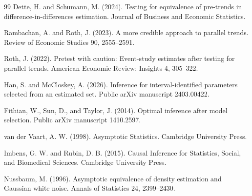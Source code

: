 \documentclass{article}
\begin{document}
\begin{thebibliography}{99}
   Dette, H. and Schumann, M. (2024). Testing for equivalence of pre-trends in difference-in-differences estimation. Journal of Business and Economic Statistics.

   Rambachan, A. and Roth, J. (2023). A more credible approach to parallel trends. Review of Economic Studies 90, 2555--2591.

   Roth, J. (2022). Pretest with caution: Event-study estimates after testing for parallel trends. American Economic Review: Insights 4, 305--322.

   Han, S. and McCloskey, A. (2026). Inference for interval-identified parameters selected from an estimated set. Public arXiv manuscript 2403.00422.

   Fithian, W., Sun, D., and Taylor, J. (2014). Optimal inference after model selection. Public arXiv manuscript 1410.2597.

   van der Vaart, A. W. (1998). Asymptotic Statistics. Cambridge University Press.

   Imbens, G. W. and Rubin, D. B. (2015). Causal Inference for Statistics, Social, and Biomedical Sciences. Cambridge University Press.

   Nussbaum, M. (1996). Asymptotic equivalence of density estimation and Gaussian white noise. Annals of Statistics 24, 2399--2430.

\end{thebibliography}
\end{document}

